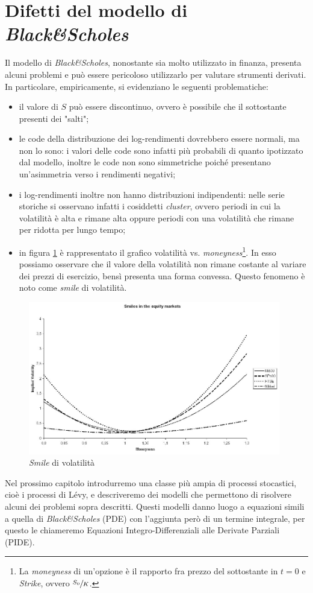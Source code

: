 \documentclass[a4paper,10pt]{report}
\theoremstyle{osservazione}
\theoremstyle{esempio}
\theoremstyle{notazione}
\theoremstyle{corollario}
\begin{document}
\section{Difetti del modello di \emph{Black\&Scholes}}
Il modello di \emph{Black\&Scholes}, nonostante sia molto utilizzato in finanza, presenta alcuni problemi e pu\`o essere pericoloso utilizzarlo per valutare strumenti derivati. In particolare, empiricamente, si evidenziano le seguenti problematiche:
\begin{itemize}
\item il valore di $S$ pu\`o essere discontinuo, ovvero \`e possibile che il sottostante presenti dei "salti";
\item le code della distribuzione dei log-rendimenti dovrebbero essere normali, ma non lo sono: i valori delle code sono infatti pi\`u probabili di quanto ipotizzato dal modello, inoltre le code non sono simmetriche poich\'e presentano un'asimmetria verso i rendimenti negativi;
\item i log-rendimenti inoltre non hanno distribuzioni indipendenti: nelle serie storiche si osservano infatti i cosiddetti \emph{cluster}, ovvero periodi in cui la volatilit\`a \`e alta e rimane alta oppure periodi con una volatilit\`a che rimane per ridotta per lungo tempo;
\item in figura \ref{smile} \`e rappresentato il grafico volatilit\`a vs. \emph{moneyness}\footnote{La \emph{moneyness} di un'opzione \`e il rapporto fra prezzo del sottostante in $t=0$ e \emph{Strike}, ovvero $\sfrac{S_0}{K}$.}. In esso possiamo osservare che il valore della volatilit\`a non rimane costante al variare dei prezzi di esercizio, bens\`i presenta una forma convessa. Questo fenomeno \`e noto come \emph{smile} di volatilit\`a. 
\end{itemize}
\begin{figure}[htbp!]
\begin{center}
\includegraphics[width=11cm]{img/smile.jpg}
\caption{\emph{Smile} di volatilit\`a}
\label{smile}
\end{center}
\end{figure}
Nel prossimo capitolo introdurremo una classe pi\`u ampia di processi stocastici, cio\`e i processi di L\'evy, e descriveremo dei modelli che permettono di risolvere alcuni dei problemi sopra descritti. Questi modelli danno luogo a equazioni simili a quella di \emph{Black\&Scholes} (PDE) con l'aggiunta per\`o di un termine integrale, per questo le chiameremo Equazioni Integro-Differenziali alle Derivate Parziali (PIDE).
\end{document}
